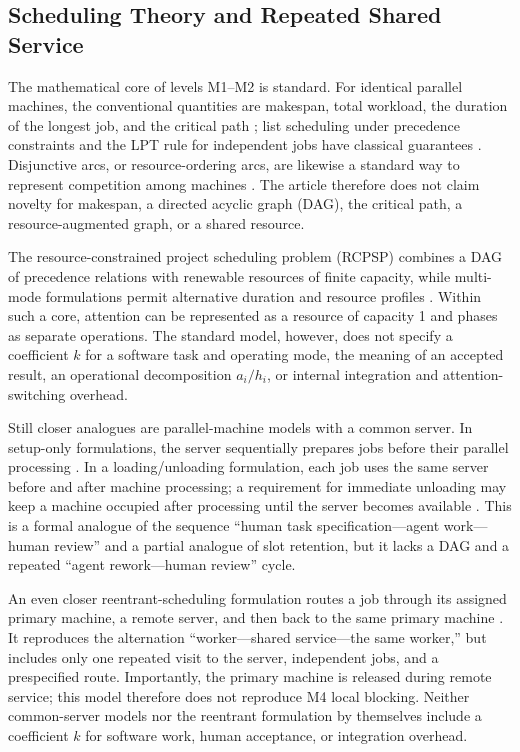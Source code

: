 \subsection{Scheduling Theory and Repeated Shared Service}

The mathematical core of levels M1--M2 is standard. For identical parallel
machines, the conventional quantities are makespan, total workload, the
duration of the longest job, and the critical path
\cite{pinedo2008scheduling}; list scheduling under precedence constraints and
the LPT rule for independent jobs have classical guarantees
\cite{graham1966bounds,graham1969bounds}. Disjunctive arcs, or resource-ordering
arcs, are likewise a standard way to represent competition among machines
\cite{pinedo2008scheduling}. The article therefore does not claim novelty for
makespan, a directed acyclic graph (DAG), the critical path, a
resource-augmented graph, or a shared resource.

The resource-constrained project scheduling problem (RCPSP) combines a DAG of
precedence relations with renewable resources of finite capacity, while
multi-mode formulations permit alternative duration and resource profiles
\cite{brucker1999resource}. Within such a core, attention can be represented as
a resource of capacity 1 and phases as separate operations. The standard model,
however, does not specify a coefficient $k$ for a software task and operating
mode, the meaning of an accepted result, an operational decomposition
$a_i/h_i$, or internal integration and attention-switching overhead.

Still closer analogues are parallel-machine models with a common server. In
setup-only formulations, the server sequentially prepares jobs before their
parallel processing \cite{hall2000parallel,kravchenko1997parallel}. In a
loading/unloading formulation, each job uses the same server before and after
machine processing; a requirement for immediate unloading may keep a machine
occupied after processing until the server becomes available
\cite{elidrissi2023loading}. This is a formal analogue of the sequence ``human
task specification---agent work---human review'' and a partial analogue of
slot retention, but it lacks a DAG and a repeated ``agent rework---human
review'' cycle.

An even closer reentrant-scheduling formulation routes a job through its
assigned primary machine, a remote server, and then back to the same primary
machine \cite{chakhlevitch2009reentrant}. It reproduces the alternation
``worker---shared service---the same worker,'' but includes only one repeated
visit to the server, independent jobs, and a prespecified route. Importantly,
the primary machine is released during remote service; this model therefore
does not reproduce M4 local blocking. Neither common-server models nor the
reentrant formulation by themselves include a coefficient $k$ for software
work, human acceptance, or integration overhead.

